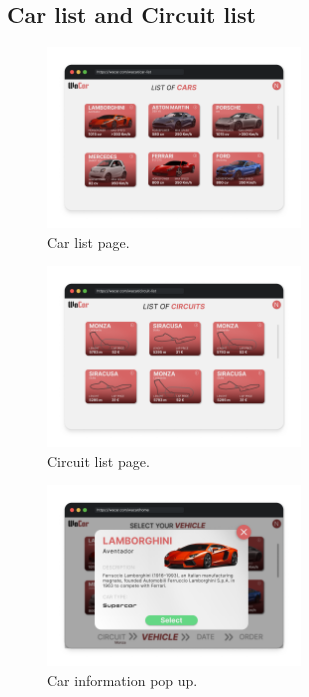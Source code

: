\subsection{Car list and Circuit list}

\begin{figure}[h]
  \centering
    \includegraphics[width=0.6\textwidth]{mockup/CarList.png}
    \caption{Car list page.}
    \label{fig:carlist}
\end{figure}

\begin{figure}[h]
    \centering
    \includegraphics[width=0.6\textwidth]{mockup/CircuitList.png}
    \caption{Circuit list page.}
    \label{fig:circuitlist}
\end{figure}

\begin{figure}[!h]
    \centering
    \includegraphics[width=0.6\textwidth]{mockup/InfoCar.png}
    \caption{Car information pop up.}
    \label{fig:infocar}
\end{figure}

